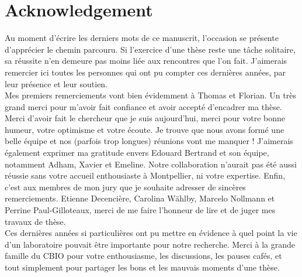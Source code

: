 
\chapter*{Acknowledgement}  \adjustmtc
{}

Au moment d'écrire les derniers mots de ce manuscrit, l'occasion se présente d'apprécier le chemin parcouru.
Si l'exercice d'une thèse reste une tâche solitaire, sa réussite n'en demeure pas moins liée aux rencontres que l'on fait.
J'aimerais remercier ici toutes les personnes qui ont pu compter ces dernières années, par leur présence et leur soutien.\\

Mes premiers remerciements vont bien évidemment à Thomas et Florian.
Un très grand merci pour m'avoir fait confiance et avoir accepté d'encadrer ma thèse.
Merci d'avoir fait le chercheur que je suis aujourd'hui, merci pour votre bonne humeur, votre optimisme et votre écoute.
Je trouve que nous avons formé une belle équipe et nos (parfois trop longues) réunions vont me manquer !
J'aimerais également exprimer ma gratitude envers Edouard Bertrand et son équipe, notamment Adham, Xavier et Emeline.
Notre collaboration n'aurait pas été aussi réussie sans votre accueil enthousiaste à Montpellier, ni votre expertise.
Enfin, c'est aux membres de mon jury que je souhaite adresser de sincères remerciements.
Etienne Decencière, Carolina Wählby, Marcelo Nollmann et Perrine Paul-Gilloteaux, merci de me faire l'honneur de lire et de juger mes travaux de thèse.\\

Ces dernières années si particulières ont pu mettre en évidence à quel point la vie d'un laboratoire pouvait être importante pour notre recherche.
Merci à la grande famille du CBIO pour votre enthousiasme, les discussions, les pauses cafés, et tout simplement pour partager les bons et les mauvais moments d'une thèse.


